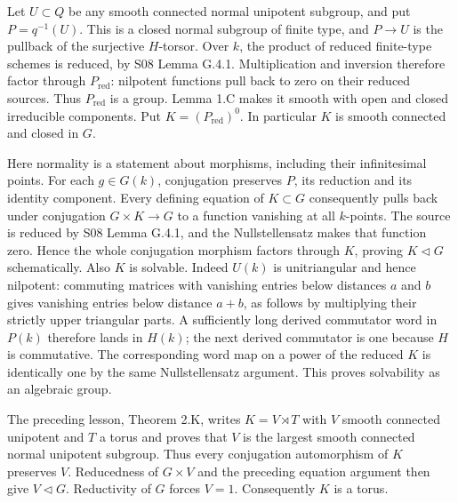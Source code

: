 \documentclass[11pt,a4paper,openany]{report}
\begin{document}
Let \(U\subset Q\) be any smooth connected normal unipotent subgroup, and put \(P=q^{-1}(U)\). This is a closed normal subgroup of finite type, and \(P\to U\) is the pullback of the surjective \(H\)-torsor. Over \(k\), the product of reduced finite-type schemes is reduced, by S08 Lemma G.4.1. Multiplication and inversion therefore factor through \(P_{\mathrm{red}}\): nilpotent functions pull back to zero on their reduced sources. Thus \(P_{\mathrm{red}}\) is a group. Lemma 1.C makes it smooth with open and closed irreducible components. Put \(K=(P_{\mathrm{red}})^0\). In particular \(K\) is smooth connected and closed in \(G\).

Here normality is a statement about morphisms, including their infinitesimal points. For each \(g\in G(k)\), conjugation preserves \(P\), its reduction and its identity component. Every defining equation of \(K\subset G\) consequently pulls back under conjugation \(G\times K\to G\) to a function vanishing at all \(k\)-points. The source is reduced by S08 Lemma G.4.1, and the Nullstellensatz makes that function zero. Hence the whole conjugation morphism factors through \(K\), proving \(K\triangleleft G\) schematically. Also \(K\) is solvable. Indeed \(U(k)\) is unitriangular and hence nilpotent: commuting matrices with vanishing entries below distances \(a\) and \(b\) gives vanishing entries below distance \(a+b\), as follows by multiplying their strictly upper triangular parts. A sufficiently long derived commutator word in \(P(k)\) therefore lands in \(H(k)\); the next derived commutator is one because \(H\) is commutative. The corresponding word map on a power of the reduced \(K\) is identically one by the same Nullstellensatz argument. This proves solvability as an algebraic group.

The preceding lesson, Theorem 2.K, writes \(K=V\rtimes T\) with \(V\) smooth connected unipotent and \(T\) a torus and proves that \(V\) is the largest smooth connected normal unipotent subgroup. Thus every conjugation automorphism of \(K\) preserves \(V\). Reducedness of \(G\times V\) and the preceding equation argument then give \(V\triangleleft G\). Reductivity of \(G\) forces \(V=1\). Consequently \(K\) is a torus.
\end{document}
